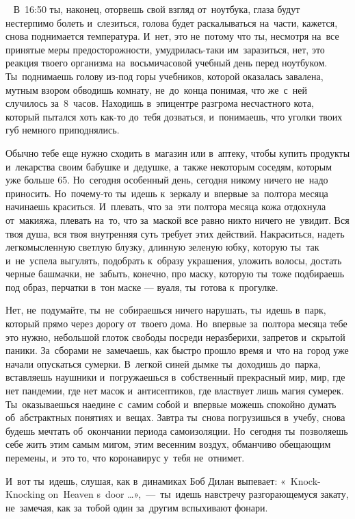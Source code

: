 ~
В~16:50 ты, наконец, оторвешь свой взгляд от~ноутбука, глаза будут нестерпимо болеть и~слезиться, голова будет раскалываться на~части, кажется, снова поднимается температура.
И~нет, это не~потому что ты, несмотря на~все принятые меры предосторожности, умудрилась-таки им~заразиться, нет, это реакция твоего организма на~восьмичасовой учебный день перед ноутбуком.
Ты~поднимаешь голову из-под горы учебников, которой оказалась завалена, мутным взором обводишь комнату, не~до~конца понимая, что же~с~ней случилось за~8~часов.
Находишь в~эпицентре разгрома несчастного кота, который пытался хоть как-то до~тебя дозваться, и~понимаешь, что уголки твоих губ немного приподнялись.

Обычно тебе еще нужно сходить в~магазин или в~аптеку, чтобы купить продукты и~лекарства своим бабушке и~дедушке, а~также некоторым соседям, которым уже больше 65.
Но~сегодня особенный день, сегодня никому ничего не~надо приносить.
Но~почему-то ты~идешь к~зеркалу и~впервые за~полтора месяца начинаешь краситься.
И~плевать, что за~эти полтора месяца кожа отдохнула от~макияжа, плевать на~то, что за~маской все равно никто ничего не~увидит.
Вся твоя душа, вся твоя внутренняя суть требует этих действий.
Накраситься, надеть легкомысленную светлую блузку, длинную зеленую юбку, которую ты~так и~не~успела выгулять, подобрать к~образу украшения, уложить волосы, достать черные башмачки, не~забыть, конечно, про маску, которую ты~тоже подбираешь под образ, перчатки в~тон маске --- вуаля, ты~готова к~прогулке.

Нет, не~подумайте, ты~не~собираешься ничего нарушать, ты~идешь в~парк, который прямо через дорогу от~твоего дома.
Но~впервые за~полтора месяца тебе это нужно, небольшой глоток свободы посреди неразберихи, запретов и~скрытой паники.
За~сборами не~замечаешь, как быстро прошло время и~что на~город уже начали опускаться сумерки.
В~легкой синей дымке ты~доходишь до~парка, вставляешь наушники и~погружаешься в~собственный прекрасный мир, мир, где нет пандемии, где нет масок и~антисептиков, где властвует лишь магия сумерек.
Ты~оказываешься наедине с~самим собой и~впервые можешь спокойно думать об~абстрактных понятиях и~вещах.
Завтра ты~снова погрузишься в~учебу, снова будешь мечтать об~окончании периода самоизоляции.
Но~сегодня ты~позволяешь себе жить этим самым мигом, этим весенним воздух, обманчиво обещающим перемены, и~это то, что коронавирус у~тебя не~отнимет.

И~вот ты~идешь, слушая, как в~динамиках Боб Дилан выпевает: «~Knock-Knocking on~Heaven s~door …»,~---~ты~идешь навстречу разгорающемуся закату, не~замечая, как за~тобой один за~другим вспыхивают фонари.
 
